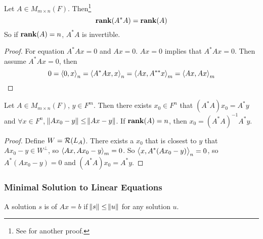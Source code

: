 \begin{theorem}
    Let $A \in M_{m\times n} (F)$. Then\footnote{See  for another proof.}
    \begin{equation}
        \displaystyle \mathbf{rank}( A^*A ) = \displaystyle \mathbf{rank}( A )
    \end{equation}
    So if $\displaystyle \mathbf{rank}( A ) = n$, $A^*A$ is invertible.
\end{theorem}
\begin{proof}
    For equation $A^*Ax = 0$ and $Ax = 0$. $Ax=0$ implies that $A^*Ax =0$. Then assume $A^*Ax = 0$, then
    \begin{equation*}
        0 = \innerproduct{0}{x}_n = \innerproduct{A^*Ax}{x}_n = \innerproduct{Ax}{A^{**}x}_m = \innerproduct{Ax}{Ax}_m
    \end{equation*}
\end{proof}


\begin{theorem}
    Let $A \in M_{m\times n} (F)$, $y \in F^m$. Then there exists $x_0 \in F^n$ that $(A^*A) x_0 = A^* y$ and $\forall x \in F^n$, $ \norm{Ax_0 - y} \leq \norm{Ax-y}$. If $\displaystyle \mathbf{rank}( A ) = n$, then $x_0 = (A^*A)^{-1} A^* y$.
\end{theorem}
\begin{proof}
    Define $W=\mathcal{R}(L_A)$. There exists a $x_0$ that is closest to $y$ that $Ax_0 - y \in W^\bot$, so $\innerproduct{Ax}{Ax_0 - y}_m = 0$. So $\innerproduct{x}{A^*(Ax_0 - y)}_n = 0$, so $A^*(Ax_0 - y) = 0$ and $(A^*A) x_0 = A^* y$. 
\end{proof}




\subsubsection{Minimal Solution to Linear Equations}

\begin{definition}
    A solution $s$ is  of $Ax=b$ if $\norm{s} \leq \norm{u}$ for any solution $u$.
\end{definition}



